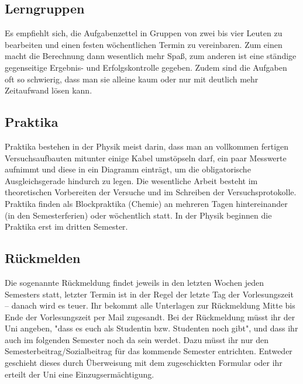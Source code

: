 \begin{multicols}{2}
\subsection*{Lerngruppen}
Es empfiehlt sich, die Aufgabenzettel in Gruppen von zwei bis vier Leuten zu bearbeiten und einen festen wöchentlichen Termin zu vereinbaren. Zum einen macht die Berechnung dann wesentlich mehr Spaß, zum anderen ist eine ständige gegenseitige Ergebnis- und Erfolgskontrolle gegeben. Zudem sind die Aufgaben oft so schwierig, dass man sie alleine kaum oder nur mit deutlich mehr Zeitaufwand lösen kann.

\subsection*{Praktika}
Praktika bestehen in der Physik meist darin, dass man an vollkommen fertigen Versuchsaufbauten mitunter einige Kabel umstöpseln darf, ein paar Messwerte aufnimmt und diese in ein Diagramm einträgt, um die obligatorische Ausgleichsgerade hindurch zu legen. Die wesentliche Arbeit besteht im theoretischen Vorbereiten der Versuche und im Schreiben der Versuchsprotokolle. Praktika finden als Blockpraktika (Chemie) an mehreren Tagen hintereinander (in den Semesterferien) oder wöchentlich statt. In der Physik beginnen die Praktika erst im dritten Semester.

\subsection*{Rückmelden}
Die sogenannte Rückmeldung findet jeweils in den letzten Wochen jeden Semesters statt, letzter Termin ist in der Regel der letzte Tag der Vorlesungszeit -- danach wird es teuer. Ihr bekommt alle Unterlagen zur Rückmeldung Mitte bis Ende der Vorlesungszeit per Mail zugesandt. Bei der Rückmeldung müsst ihr der Uni angeben, "dass es euch als Studentin bzw. Studenten noch gibt", und dass ihr auch im folgenden Semester noch da sein werdet. Dazu müsst ihr nur den Semesterbeitrag/Sozialbeitrag für das kommende Semester entrichten. Entweder geschieht dieses durch Überweisung mit dem zugeschickten Formular oder ihr erteilt der Uni eine Einzugsermächtigung.


\end{multicols}
